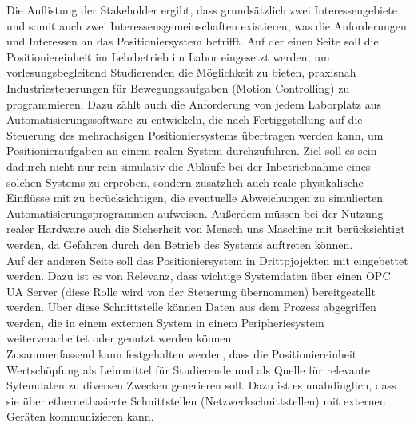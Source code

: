 \documentclass[../Bachelorarbeit.tex]{subfiles}
\begin{document}
Die Auflistung der Stakeholder ergibt, dass grundsätzlich zwei Interessengebiete und somit auch zwei Interessensgemeinschaften existieren, was die Anforderungen und Interessen an das Positioniersystem betrifft. Auf der einen Seite soll die Positioniereinheit im Lehrbetrieb im Labor eingesetzt werden, um vorlesungsbegleitend Studierenden die Möglichkeit zu bieten, praxisnah Industriesteuerungen für Bewegungsaufgaben (Motion Controlling) zu programmieren. Dazu zählt auch die Anforderung von jedem Laborplatz aus Automatisierungssoftware zu entwickeln, die nach Fertiggstellung auf die Steuerung des mehrachsigen Positioniersystems übertragen werden kann, um Positionieraufgaben an einem realen System durchzuführen. Ziel soll es sein dadurch nicht nur rein simulativ die Abläufe bei der Inbetriebnahme eines solchen Systems zu erproben, sondern zusätzlich auch reale physikalische Einflüsse mit zu berücksichtigen, die eventuelle Abweichungen zu simulierten Automatisierungsprogrammen aufweisen. Außerdem müssen bei der Nutzung realer Hardware auch die Sicherheit von Mensch uns Maschine mit berücksichtigt werden, da Gefahren durch den Betrieb des Systems auftreten können.\\
Auf der anderen Seite soll das Positioniersystem in Drittpjojekten mit eingebettet werden. Dazu ist es von Relevanz, dass wichtige Systemdaten über einen OPC UA Server (diese Rolle wird von der Steuerung übernommen) bereitgestellt werden. Über diese Schnittstelle können Daten aus dem Prozess abgegriffen werden, die in einem externen System \bzw in einem Peripheriesystem weiterverarbeitet oder genutzt werden können.\\
Zusammenfassend kann festgehalten werden, dass die Positioniereinheit Wertschöpfung als Lehrmittel für Studierende und als Quelle für relevante Sytemdaten zu diversen Zwecken generieren soll. Dazu ist es unabdinglich, dass sie über ethernetbasierte Schnittstellen (Netzwerkschnittstellen) mit externen Geräten kommunizieren kann. 
\end{document}

